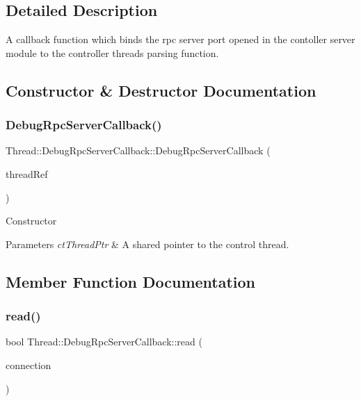 \subsection{Detailed Description}
A callback function which binds the rpc server port opened in the contoller server module to the controller thread\textquotesingle{}s parsing function. 

\subsection{Constructor \& Destructor Documentation}
\hypertarget{classThread_1_1DebugRpcServerCallback_a479142cdf2f840df23b4605a532aaddf}{}\label{classThread_1_1DebugRpcServerCallback_a479142cdf2f840df23b4605a532aaddf} 
\subsubsection{\texorpdfstring{Debug\+Rpc\+Server\+Callback()}{DebugRpcServerCallback()}}
{\footnotesize\ttfamily Thread\+::\+Debug\+Rpc\+Server\+Callback\+::\+Debug\+Rpc\+Server\+Callback (\begin{DoxyParamCaption}\item[{\hyperlink{classThread}{Thread} \&}]{thread\+Ref }\end{DoxyParamCaption})}

Constructor 
\begin{DoxyParams}{Parameters}
{\em ct\+Thread\+Ptr} & A shared pointer to the control thread. \\
\hline
\end{DoxyParams}


\subsection{Member Function Documentation}
\hypertarget{classThread_1_1DebugRpcServerCallback_a3b39ac9b379ce3212bb2b05a89fa6024}{}\label{classThread_1_1DebugRpcServerCallback_a3b39ac9b379ce3212bb2b05a89fa6024} 
\subsubsection{\texorpdfstring{read()}{read()}}
{\footnotesize\ttfamily bool Thread\+::\+Debug\+Rpc\+Server\+Callback\+::read (\begin{DoxyParamCaption}\item[{yarp\+::os\+::\+Connection\+Reader \&}]{connection }\end{DoxyParamCaption})\hspace{0.3cm}{\ttfamily [virtual]}}


